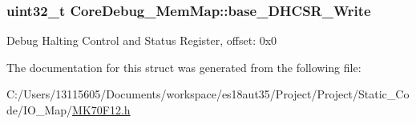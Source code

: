 \subsubsection[{base\+\_\+\+D\+H\+C\+S\+R\+\_\+\+Write}]{\setlength{\rightskip}{0pt plus 5cm}uint32\+\_\+t Core\+Debug\+\_\+\+Mem\+Map\+::base\+\_\+\+D\+H\+C\+S\+R\+\_\+\+Write}\label{struct_core_debug___mem_map_a57de52c8c1eb5789546543f2408ce487}
Debug Halting Control and Status Register, offset\+: 0x0 

The documentation for this struct was generated from the following file\+:\begin{DoxyCompactItemize}
\item 
C\+:/\+Users/13115605/\+Documents/workspace/es18aut35/\+Project/\+Project/\+Static\+\_\+\+Code/\+I\+O\+\_\+\+Map/\hyperlink{_m_k70_f12_8h}{M\+K70\+F12.\+h}\end{DoxyCompactItemize}
